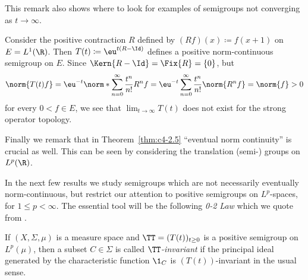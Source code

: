 This remark also shows where to look for examples of semigroups not converging as $t \to \infty$.

Consider the positive contraction $R$ defined by $(Rf)(x) \coloneqq f(x+1)$ on $E = L^{1}(\R)$.
Then $T(t) \coloneqq \eu^{t(R-\Id)}$ defines a positive norm-continuous semigroup on $E$.
Since $\Kern{R - \Id} = \Fix{R} = \{0\}$, but 
\[
\norm{T(t)f} = \eu^{-t} \norm*{\sum_{n=0}^{\infty} \frac{t^n}{n!}R^{n}f} = 
\eu^{-t}\sum_{n=0}^{\infty} \frac{t^n}{n!}\norm{R^{n}f}= \norm{f} > 0
\] 
for every $0 < f \in E$, we see that $\lim_{t\to\infty} T(t)$ does not exist for the strong operator topology.

Finally we remark that in Theorem~\ref{thm:c4-2.5} \enquote{eventual norm continuity} is crucial as well.
This can be seen by considering the translation (semi-) groups on $L^{p}(\R)$.

In the next few results we study semigroups which are not necessarily eventually norm-continuous, but restrict our attention to positive semigroups on $L^{p}$-spaces, for $1 \leq p < \infty$.
The essential tool will be the following \emph{0-2 Law} which we quote from \textcite[Theorem~3.7]{greiner:1982}.

If\/ $(X, \Sigma, \mu)$ is a measure space and $\TT = (T(t))_{t \geq 0}$ is a positive semigroup on $L^{p}(\mu)$, then a subset $C \in \Sigma$ is called \emph{$\TT$-invariant} if the principal ideal generated by the characteristic function $\1_{C}$ is $(T(t))$-invariant in the usual sense.

